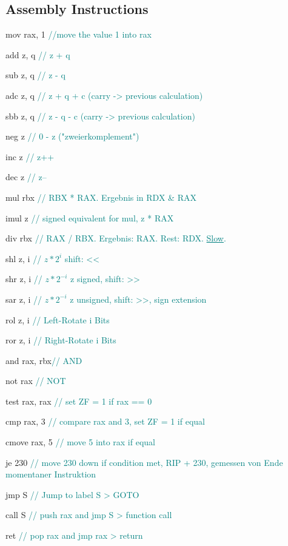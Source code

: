 \begin{multicols*}{4}
\subsection{Assembly Instructions}
\begin{description}
    \item mov rax, 1 \textcolor{teal}{//move the value 1 into rax}
    \item add z,   q  \textcolor{teal}{// z + q}
    \item sub z,   q  \textcolor{teal}{// z - q}
    \item adc z,   q  \textcolor{teal}{// z + q + c (carry -> previous calculation)}
    \item sbb z,   q  \textcolor{teal}{// z - q - c (carry -> previous calculation)}
    \item neg z       \textcolor{teal}{// 0 - z ("zweierkomplement")}
    \item inc z       \textcolor{teal}{// z++ }
    \item dec z       \textcolor{teal}{// z-- }
    \item mul rbx     \textcolor{teal}{// RBX * RAX. Ergebnis in RDX \& RAX }
    \item imul z      \textcolor{teal}{// signed equivalent for mul, z * RAX }
    \item div rbx      \textcolor{teal}{// RAX / RBX. Ergebnis: RAX. Rest: RDX. \underline{Slow}.}
    \item shl z,   i  \textcolor{teal}{// \(z * 2^i\) shift: <<}
    \item shr z,   i  \textcolor{teal}{// \(z * 2^{-i}\) z signed, shift: >>}
    \item sar z,   i  \textcolor{teal}{// \(z * 2^{-i}\) z unsigned, shift: >>, sign extension}
    \item rol z,   i  \textcolor{teal}{// Left-Rotate i Bits }
    \item ror z,   i  \textcolor{teal}{// Right-Rotate i Bits }
    \item and rax, rbx\textcolor{teal}{// AND}
    \item not rax     \textcolor{teal}{// NOT}
    \item test rax, rax \textcolor{teal}{// set ZF = 1 if rax == 0}
    \item cmp rax, 3 \textcolor{teal}{// compare rax and 3, set ZF = 1 if equal}
    \item cmove rax, 5 \textcolor{teal}{// move 5 into rax if equal}
    \item je 230 \textcolor{teal}{// move 230 down if condition met, RIP + 230, gemessen von Ende momentaner Instruktion}
    \item jmp S       \textcolor{teal}{// Jump to label S > GOTO}
    \item call S \textcolor{teal}{// push rax and jmp S > function call}
    \item ret    \textcolor{teal}{// pop rax and jmp rax > return}
\end{description}


\end{multicols*}
